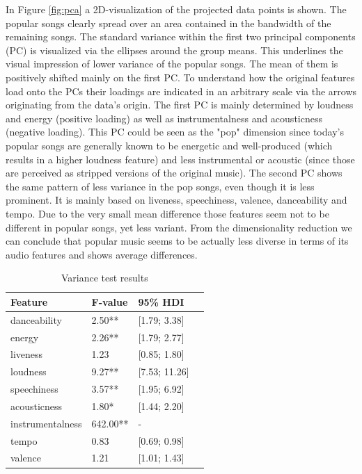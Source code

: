 \documentclass{article}
\begin{document}
In Figure \ref{fig:pca} a 2D-visualization of the projected data points is shown. The popular songs clearly spread over an area contained in the bandwidth of the remaining songs. The standard variance within the first two principal components (PC) is visualized via the ellipses around the group means. This underlines the visual impression of lower variance of the popular songs. The mean of them is positively shifted mainly on the first PC. To understand how the original features load onto the PCs their loadings are indicated in an arbitrary scale via the arrows originating from the data's origin. The first PC is mainly determined by loudness and energy (positive loading) as well as instrumentalness and acousticness (negative loading). This PC could be seen as the "pop" dimension since today's popular songs are generally known to be energetic and well-produced (which results in a higher loudness feature) and less instrumental or acoustic (since those are perceived as stripped versions of the original music). The second PC shows the same pattern of less variance in the pop songs, even though it is less prominent. It is mainly based on liveness, speechiness, valence, danceability and tempo. Due to the very small mean difference those features seem not to be different in popular songs, yet less variant. From the dimensionality reduction we can conclude that popular music seems to be actually less diverse in terms of its audio features and shows average differences.

\begin{table}[h!]
  \caption{Variance test results}
  \label{tab:var}
  \centering
  \begin{tabular}{lllc}
    \toprule
    Feature     & F-value & 95\% HDI\\
    \midrule
	danceability        	&  2.50** & [1.79; 3.38]\\
	energy              		&  2.26** & [1.79; 2.77]\\
	liveness            		&  1.23   & [0.85; 1.80]\\
	loudness            	&  9.27** & [7.53; 11.26]\\
	speechiness         	&  3.57** & [1.95; 6.92]\\
	acousticness        	&  1.80*  & [1.44; 2.20]\\
	instrumentalness    	&642.00** & -\\
	tempo               		&  0.83   & [0.69; 0.98]\\
	valence             	&  1.21   & [1.01; 1.43]\\
    \bottomrule
  \end{tabular}
\end{table}
\end{document}
